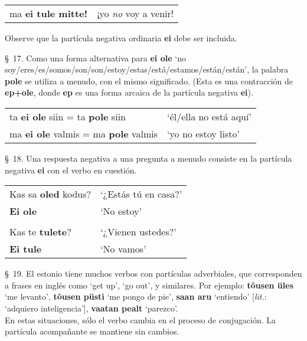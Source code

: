 \begin{center}
\begin{tabular}{ l l }
	ma \textbf{ei tule mitte!} & ¡yo \emph{no} voy a venir!
\end{tabular}	
\end{center}
\bigskip

Observe que la partícula negativa ordinaria \textbf{ei} debe ser incluida.

\S\ 17. Como una forma alternativa para \textbf{ei ole} `no soy/eres/es/somos/son/son/estoy/estas/está/estamos/están/están', la palabra \textbf{pole} se utiliza a menudo, con el mismo significado. (Esta es una contracción de \textbf{ep+ole}, donde \textbf{ep} es una forma arcaica de la partícula negativa \textbf{ei}).

\begin{center}
\begin{tabular}{ l l }
	ta \textbf{ei ole} siin = ta \textbf{pole} siin & `él/ella no está aquí' \\
	ma \textbf{ei ole} valmis = ma \textbf{pole} valmis & `yo no estoy listo' 
\end{tabular}	
\end{center}
\bigskip

\S\ 18. Una respuesta negativa a una pregunta a menudo consiste en la partícula negativa \textbf{ei} con el verbo en cuestión.

\begin{center}
\begin{tabular}{ l l }
	Kas sa \textbf{oled} kodus? & `¿Estás tú en casa?' \\
	\textbf{Ei ole} & `No estoy' \\
	& \\
	Kas te \textbf{tulete}? & `¿Vienen ustedes?' \\
	\textbf{Ei tule} & `No vamos' \\
\end{tabular}	
\end{center}
\bigskip

\S\ 19. El estonio tiene muchos verbos con partículas adverbiales, que corresponden a frases en inglés como `get up', `go out', y similares. Por ejemplo: \textbf{tõusen üles} `me levanto', \textbf{tõusen püsti} `me pongo de pie', \textbf{saan aru} `entiendo' [\emph{lit.}: `adquiero inteligencia'], \textbf{vaatan pealt} `parezco'.\\

En estas situaciones, sólo el verbo cambia en el proceso de conjugación. La partícula acompañante se mantiene sin cambios.

